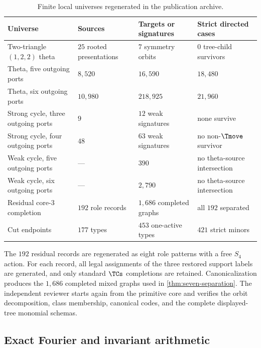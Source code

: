 \begin{table}[t]
\centering
\small
\caption{Finite local universes regenerated in the publication archive.}
\label{tab:regen-counts}
\begin{tabularx}{\textwidth}{@{}>{\raggedright\arraybackslash}X>{\centering\arraybackslash}p{2.6cm}>{\centering\arraybackslash}p{3.2cm}>{\centering\arraybackslash}p{3.0cm}@{}}
\toprule
Universe & Sources & Targets or signatures & Strict directed cases\\
\midrule
Two-triangle $(1,2,2)$ theta & $25$ rooted presentations & $7$ symmetry orbits & $0$ tree-child survivors\\
Theta, five outgoing ports & $8{,}520$ & $16{,}590$ & $18{,}480$\\
Theta, six outgoing ports & $10{,}980$ & $218{,}925$ & $21{,}960$\\
Strong cycle, three outgoing ports & $9$ & $12$ weak signatures & none survive\\
Strong cycle, four outgoing ports & $48$ & $63$ weak signatures & no non-$\Tmove$ survivor\\
Weak cycle, five outgoing ports & --- & $390$ & no theta-source intersection\\
Weak cycle, six outgoing ports & --- & $2{,}790$ & no theta-source intersection\\
Residual core-3 completion & $192$ role records & $1{,}686$ completed graphs & all $192$ separated\\
Cut endpoints & $177$ types & $453$ one-active types & $421$ strict minors\\
\bottomrule
\end{tabularx}
\end{table}

The $192$ residual records are regenerated as eight role patterns with a free $S_4$ action.  For each record, all legal assignments of the three restored support labels are generated, and only standard $\TCs$ completions are retained.  Canonicalization produces the $1{,}686$ completed mixed graphs used in \cref{thm:seven-separation}.  The independent reviewer starts again from the primitive core and verifies the orbit decomposition, class membership, canonical codes, and the complete displayed-tree monomial schemas.

\subsection{Exact Fourier and invariant arithmetic}

